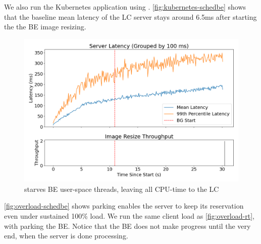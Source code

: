 We also run the Kubernetes application using \beclass{}.
\autoref{fig:kubernetes-schedbe} shows that the baseline mean latency of the LC
server stays around 6.5ms after starting the the BE image resizing.

\begin{figure}[t]
    \centering
    \includegraphics[width=\columnwidth]{graphs/overload-schedbe.png}
    \caption{ \beclass{} starves BE user-space threads, leaving all CPU-time to
    the LC}\label{fig:overload-schedbe}
\end{figure}

\autoref{fig:overload-schedbe} shows parking enables the server to keep its
reservation even under sustained 100\% load. We run the same client load as
\autoref{fig:overload-rt}, with \beclass{} parking the BE. Notice that the BE
does not make progress until the very end, when the server is done processing.
